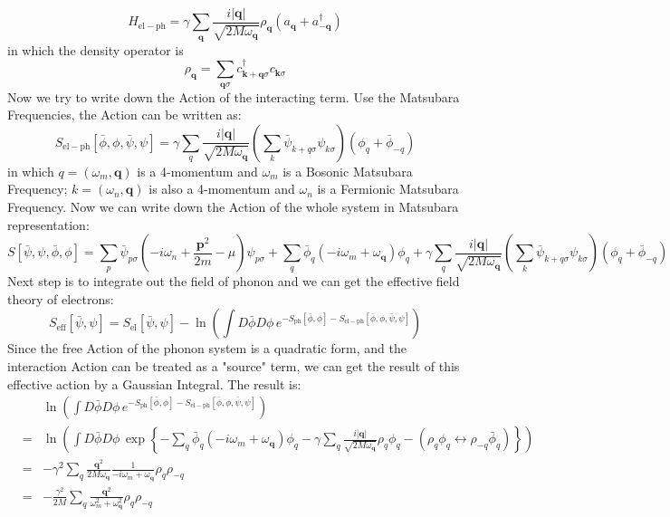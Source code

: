 \documentclass{article}
\newcommand{\mtp}{\mathbf{p}}
\newcommand{\mtq}{\mathbf{q}}
\newcommand{\mtk}{\mathbf{k}}
\begin{document}
\begin{equation}
H_{\mathrm{el-ph}} = \gamma \sum_{\mtq}\frac{i|\mtq|}{\sqrt{2M\omega_{\mtq}}} \rho_{\mtq}(a_{\mtq}+ a^\dagger_{-\mtq}) 
\end{equation}
in which the density operator is
$$
\rho_{\mtq} = \sum_{\mtq\sigma} c^\dagger_{\mtk+\mtq\sigma}c_{\mtk\sigma}
$$
Now we try to write down the Action of the interacting term. Use the Matsubara Frequencies, the Action can be written as:
\begin{equation}
S_{\mathrm{el-ph}}[\bar{\phi},\phi,\bar{\psi},\psi] = \gamma \sum_{q}\frac{i|\mtq|}{\sqrt{2M\omega_\mtq}}\left(\sum_k \bar{\psi}_{k+q\sigma}\psi_{k\sigma} \right)(\phi_{q}+ \bar{\phi}_{-q}) 
\end{equation}
in which $q = (\omega_m, \mtq)$ is a 4-momentum and $\omega_m$ is a Bosonic Matsubara Frequency; $k = (\omega_n,\mtq)$ is also a 4-momentum and $\omega_n$ is a Fermionic Matsubara Frequency. Now we can write down the Action of the whole system in Matsubara representation:
\begin{equation}
S[\bar{\psi},\psi,\bar{\phi},\phi] = \sum_{p}\bar{\psi}_{p\sigma}\left(-i\omega_n +\frac{\mtp^2}{2m}-\mu\right)\psi_{p\sigma} + \sum_q \bar{\phi}_q(-i\omega_m+\omega_\mtq)\phi_q +  \gamma \sum_{q}\frac{i|\mtq|}{\sqrt{2M\omega_\mtq}}\left(\sum_k \bar{\psi}_{k+q\sigma}\psi_{k\sigma} \right)(\phi_{q}+ \bar{\phi}_{-q}) 
\end{equation}
Next step is to integrate out the field of phonon and we can get the effective field theory of electrons:
\begin{equation}
S_{\mathrm{eff}}[\bar{\psi},\psi] = S_{\mathrm{el}}[\bar{\psi},\psi] - \ln{\left(\int D\bar{\phi}D\phi\,e^{-S_{\mathrm{ph}}[\bar{\phi},\phi]-S_{\mathrm{el-ph}}[\bar{\phi},\phi,\bar{\psi},\psi]}\right)}
\end{equation}
Since the free Action of the phonon system is a quadratic form, and the interaction Action can be treated as a "source" term, we can get the result of this effective action by a Gaussian Integral. The result is:
\begin{eqnarray}
& & \ln\left(\int D\bar\phi D\phi\,e^{-S_{\mathrm{ph}}[\bar{\phi},\phi]-S_{\mathrm{el-ph}}[\bar{\phi},\phi,\bar{\psi},\psi]}\right)\nonumber\\
&=& \ln\left(\int D\bar\phi D\phi\, \exp\left\{- \sum_q \bar{\phi}_q(-i\omega_m+\omega_\mtq)\phi_q - \gamma\sum_q \frac{i|\mtq|}{\sqrt{2M\omega_\mtq}}\rho_q\phi_q - (\rho_q\phi_q\leftrightarrow\rho_{-q}\bar{\phi}_{q}) \right\}\right)\nonumber\\
&=& - \gamma^2 \sum_q \frac{\mtq^2}{2M\omega_\mtq}\frac{1}{-i\omega_m+ \omega_\mtq}\rho_q\rho_{-q}\nonumber\\
&=& -\frac{\gamma^2}{2M}\sum_q \frac{\mtq^2}{\omega_m^2 + \omega_\mtq^2}\rho_q\rho_{-q}
\end{eqnarray}
\end{document}
